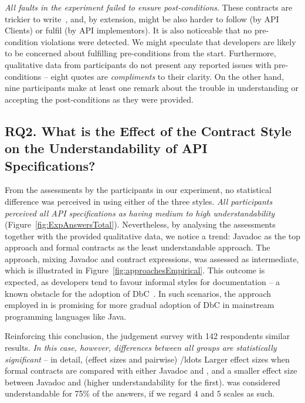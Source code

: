 \emph{All faults in the experiment failed to ensure post-conditions}. 
These contracts are trickier to write~\cite{Rosenblum}, and, by extension, might be also harder to follow (by API Clients) or fulfil (by API implementors). 
It is also noticeable that no pre-condition violations were detected. We might speculate that developers are likely to be concerned about fulfilling pre-conditions from the start.%
Furthermore, qualitative data from participants do not present any reported issues with pre-conditions -- eight quotes are \emph{compliments} to their clarity. On the other hand, nine participants make at least one remark about the trouble in understanding or accepting the post-conditions as they were provided.


\subsection{RQ2. What is the Effect of the Contract Style on the Understandability of API Specifications?}
\label{rq2}

From the assessments by the participants in our experiment, no statistical difference was perceived in using either of the three styles. \emph{All participants perceived all API specifications as having medium to high understandability} (Figure~\ref{fig:ExpAnswersTotal}). 
Nevertheless, by analysing the assessments together with the provided qualitative data, we notice a trend: Javadoc as the top approach and formal contracts as the least understandable approach. The \contractjdoc{} approach, mixing Javadoc and contract expressions, was assessed as intermediate, which is illustrated in Figure~\ref{fig:approachesEmpirical}.
This outcome is expected, as developers tend to favour informal styles for documentation -- a known obstacle for the adoption of DbC~\cite{Polikarpova-etal09}. In such scenarios, the approach employed in \contractjdoc{} is promising for more gradual adoption of DbC in mainstream programming languages like Java.

Reinforcing this conclusion, the judgement survey with 142 respondents similar results. 
\emph{In this case, however, differences between all groups are statistically significant} -- in detail, (effect sizes and pairwise) /ldots
Larger effect sizes when formal contracts are compared with either Javadoc and \contractjdoc{}, and a smaller effect size between Javadoc and \contractjdoc{} (higher understandability for the first).
\contractjdoc{} was considered understandable for 75\% of the answers, if we regard $4$ and $5$ scales as such.


